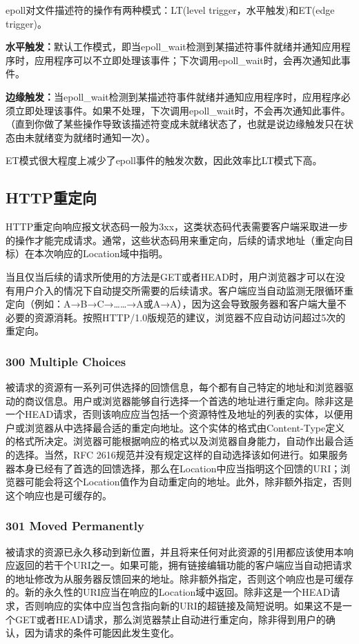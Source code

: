 \documentclass{article}
\begin{document}
epoll对文件描述符的操作有两种模式：LT(level trigger，水平触发)和ET(edge trigger)。

\textbf{水平触发：}默认工作模式，即当epoll\_wait检测到某描述符事件就绪并通知应用程序时，应用程序可以不立即处理该事件；下次调用epoll\_wait时，会再次通知此事件。

\textbf{边缘触发：}当epoll\_wait检测到某描述符事件就绪并通知应用程序时，应用程序必须立即处理该事件。如果不处理，下次调用epoll\_wait时，不会再次通知此事件。（直到你做了某些操作导致该描述符变成未就绪状态了，也就是说边缘触发只在状态由未就绪变为就绪时通知一次）。

ET模式很大程度上减少了epoll事件的触发次数，因此效率比LT模式下高。

\subsection{HTTP重定向}
HTTP重定向响应报文状态码一般为3xx，这类状态码代表需要客户端采取进一步的操作才能完成请求。通常，这些状态码用来重定向，后续的请求地址（重定向目标）在本次响应的Location域中指明。

当且仅当后续的请求所使用的方法是GET或者HEAD时，用户浏览器才可以在没有用户介入的情况下自动提交所需要的后续请求。客户端应当自动监测无限循环重定向（例如：A→B→C→……→A或A→A），因为这会导致服务器和客户端大量不必要的资源消耗。按照HTTP/1.0版规范的建议，浏览器不应自动访问超过5次的重定向。

\subsubsection{300 Multiple Choices}
被请求的资源有一系列可供选择的回馈信息，每个都有自己特定的地址和浏览器驱动的商议信息。用户或浏览器能够自行选择一个首选的地址进行重定向。除非这是一个HEAD请求，否则该响应应当包括一个资源特性及地址的列表的实体，以便用户或浏览器从中选择最合适的重定向地址。这个实体的格式由Content-Type定义的格式所决定。浏览器可能根据响应的格式以及浏览器自身能力，自动作出最合适的选择。当然，RFC 2616规范并没有规定这样的自动选择该如何进行。如果服务器本身已经有了首选的回馈选择，那么在Location中应当指明这个回馈的URI；浏览器可能会将这个Location值作为自动重定向的地址。此外，除非额外指定，否则这个响应也是可缓存的。

\subsubsection{301 Moved Permanently}
被请求的资源已永久移动到新位置，并且将来任何对此资源的引用都应该使用本响应返回的若干个URI之一。如果可能，拥有链接编辑功能的客户端应当自动把请求的地址修改为从服务器反馈回来的地址。除非额外指定，否则这个响应也是可缓存的。新的永久性的URI应当在响应的Location域中返回。除非这是一个HEAD请求，否则响应的实体中应当包含指向新的URI的超链接及简短说明。如果这不是一个GET或者HEAD请求，那么浏览器禁止自动进行重定向，除非得到用户的确认，因为请求的条件可能因此发生变化。
\end{document}
